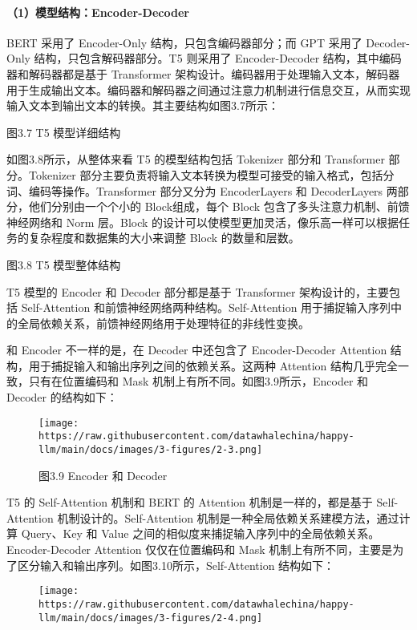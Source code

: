 \documentclass[12pt,a4paper]{book}
\begin{document}
\paragraph{（1）模型结构：Encoder-Decoder}\label{ux6a21ux578bux7ed3ux6784encoder-decoder}

BERT 采用了 Encoder-Only 结构，只包含编码器部分；而 GPT 采用了
Decoder-Only 结构，只包含解码器部分。T5 则采用了 Encoder-Decoder
结构，其中编码器和解码器都是基于 Transformer
架构设计。编码器用于处理输入文本，解码器用于生成输出文本。编码器和解码器之间通过注意力机制进行信息交互，从而实现输入文本到输出文本的转换。其主要结构如图3.7所示：

图3.7 T5 模型详细结构

如图3.8所示，从整体来看 T5 的模型结构包括 Tokenizer 部分和 Transformer
部分。Tokenizer
部分主要负责将输入文本转换为模型可接受的输入格式，包括分词、编码等操作。Transformer
部分又分为 EncoderLayers 和 DecoderLayers 两部分，他们分别由一个个小的
Block组成，每个 Block 包含了多头注意力机制、前馈神经网络和 Norm
层。Block
的设计可以使模型更加灵活，像乐高一样可以根据任务的复杂程度和数据集的大小来调整
Block 的数量和层数。

图3.8 T5 模型整体结构

T5 模型的 Encoder 和 Decoder 部分都是基于 Transformer
架构设计的，主要包括 Self-Attention
和前馈神经网络两种结构。Self-Attention
用于捕捉输入序列中的全局依赖关系，前馈神经网络用于处理特征的非线性变换。

和 Encoder 不一样的是，在 Decoder 中还包含了 Encoder-Decoder Attention
结构，用于捕捉输入和输出序列之间的依赖关系。这两种 Attention
结构几乎完全一致，只有在位置编码和 Mask
机制上有所不同。如图3.9所示，Encoder 和 Decoder 的结构如下：

\begin{figure}[htbp]\centering
\texttt{[image: https://raw.githubusercontent.com/datawhalechina/happy-llm/main/docs/images/3-figures/2-3.png]}
\caption{图3.9 Encoder 和 Decoder}
\end{figure}

T5 的 Self-Attention 机制和 BERT 的 Attention 机制是一样的，都是基于
Self-Attention 机制设计的。Self-Attention
机制是一种全局依赖关系建模方法，通过计算 Query、Key 和 Value
之间的相似度来捕捉输入序列中的全局依赖关系。Encoder-Decoder Attention
仅仅在位置编码和 Mask
机制上有所不同，主要是为了区分输入和输出序列。如图3.10所示，Self-Attention
结构如下：

\begin{figure}[htbp]\centering
\texttt{[image: https://raw.githubusercontent.com/datawhalechina/happy-llm/main/docs/images/3-figures/2-4.png]}
\end{figure}
\end{document}
